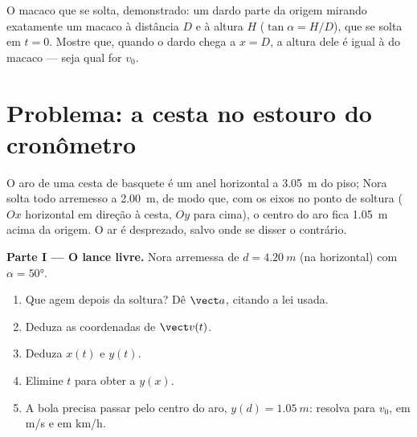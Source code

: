 \begin{exercise}[$\star\star\star$]\label{exo:g12:projectile-motion:15}
O macaco que se solta, demonstrado: um dardo parte da origem mirando exatamente um
macaco à distância $D$ e à altura $H$ ($\tan\alpha = H/D$), que se solta em $t = 0$.
Mostre que, quando o dardo chega a $x = D$, a altura dele é igual à do macaco ---
seja qual for $v_0$.
\end{exercise}

\section{Problema: a cesta no estouro do cronômetro}

\begin{problem}
\label{pb:g12:projectile-motion:1}
O aro de uma cesta de basquete é um anel horizontal a \qty{3.05}{m} do piso; Nora
solta todo arremesso a \qty{2.00}{m}, de modo que, com os eixos no ponto de soltura
($Ox$ horizontal em direção à cesta, $Oy$ para cima), o centro do aro fica
\qty{1.05}{m} acima da origem. O ar é desprezado, salvo onde se disser o contrário.

\medskip\noindent\textbf{Parte I --- O lance livre.} Nora arremessa de
$d = \qty{4.20}{m}$ (na horizontal) com  $\alpha = \ang{50}$.
\begin{enumerate}
  \item Que  agem depois da soltura? Dê $\vect a$, citando a lei usada.
  \item Deduza as coordenadas de $\vect v(t)$.
  \item Deduza $x(t)$ e $y(t)$.
  \item Elimine $t$ para obter a  $y(x)$.
  \item A bola precisa passar pelo centro do aro, $y(d) = \qty{1.05}{m}$: resolva para
        $v_0$, em \unit{m/s} e em \unit{km/h}.
\end{enumerate}


\end{problem}
